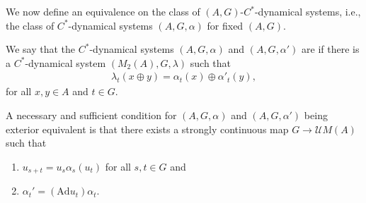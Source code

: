 We now define an equivalence on the class of $(A,G)$-$C^*$-dynamical systems, i.e., the class of $C^*$-dynamical systems $(A, G, \alpha)$ for fixed $(A,G)$. 
\begin{definition}
	We say that the $C^*$-dynamical systems $(A,G,\alpha)$ and $(A, G, \alpha')$ are  if there is a $C^*$-dynamical system $(M_2(A), G, \lambda)$ such that
	\begin{align*}
		\lambda_t (x \oplus y) = \alpha_t(x) \oplus \alpha'_t(y),
	\end{align*}
	for all $x,y \in A$ and $t \in G$.
\end{definition}
\begin{lemma}
	A necessary and sufficient condition for $(A, G , \alpha)$ and $(A, G , \alpha')$ being exterior equivalent is that there exists a strongly continuous map $G \to \mathcal{U} M(A)$ such that
	\begin{enumerate}[nosep]
		\item $u_{s+t}=u_s\alpha_s(u_t)$ for all $s,t \in G$ and
		\item $\alpha_t' = (\mathrm{Ad} u_t ) \alpha_t$.
	\end{enumerate}
\end{lemma}
